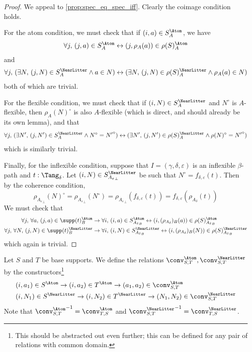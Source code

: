 \begin{proof}
  We appeal to \cref{prop:spec_eq_spec_iff}.
  Clearly the coimage condition holds.

  For the atom condition, we must check that if \( (i, a) \in S_A^\Atom \), we have
  \[ \forall j,\, (j, a) \in S_A^\Atom \leftrightarrow (j, \rho_A(a)) \in \rho(S)_A^\Atom \]
  and
  \[ \forall j,\, (\exists N,\, (j, N) \in S_A^\NearLitter \wedge a \in N) \leftrightarrow (\exists N,\, (j, N) \in \rho(S)_A^\NearLitter \wedge \rho_A(a) \in N) \]
  both of which are trivial.

  For the flexible condition, we must check that if \( (i, N) \in S_A^\NearLitter \) and \( N^\circ \) is \( A \)-flexible, then \( \rho_A(N)^\circ \) is also \( A \)-flexible (which is direct, and should already be its own lemma), and that
  \[ \forall j,\, (\exists N',\, (j, N') \in S_A^\NearLitter \wedge N^\circ = {N'}^\circ) \leftrightarrow (\exists N',\, (j, N') \in \rho(S)_A^\NearLitter \wedge \rho(N)^\circ = {N'}^\circ) \]
  which is similarly trivial.

  Finally, for the inflexible condition, suppose that \( I = (\gamma,\delta,\varepsilon) \) is an inflexible \( \beta \)-path and \( t : \Tang_\delta \).
  Let \( (i, N) \in S_{{A_\varepsilon}_\bot}^\NearLitter \) be such that \( N^\circ = f_{\delta,\varepsilon}(t) \).
  Then by the coherence condition,
  \[ \rho_{{A_\varepsilon}_\bot}(N)^\circ = \rho_{{A_\varepsilon}_\bot}(N^\circ) = \rho_{{A_\varepsilon}_\bot}(f_{\delta,\varepsilon}(t)) = f_{\delta,\varepsilon}(\rho_{A_\delta}(t)) \]
  We must check that
  \begin{align*}
    \forall j,\, \forall a,\, (j, a) \in \supp(t)_B^\Atom &\to \forall i,\, (i, a) \in S_{{A_\delta}_B}^\Atom \leftrightarrow (i, (\rho_{A_\delta})_B(a)) \in \rho(S)_{{A_\delta}_B}^\Atom \\
    \forall j,\, \forall N,\, (j, N) \in \supp(t)_B^\NearLitter &\to \forall i,\, (i, N) \in S_{{A_\delta}_B}^\NearLitter \leftrightarrow (i, (\rho_{A_\delta})_B(N)) \in \rho(S)_{{A_\delta}_B}^\NearLitter
  \end{align*}
  which again is trivial.
\end{proof}
\begin{definition}
  \label{def:conv_base}
  Let \( S \) and \( T \) be base supports.
  We define the relations \( \conv_{S,T}^\Atom, \conv_{S,T}^\NearLitter \) by the constructors\footnote{This should be abstracted out even further; this can be defined for any pair of relations with common domain.}
  \begin{align*}
    &(i, a_1) \in S^\Atom \to (i, a_2) \in T^\Atom \to (a_1, a_2) \in \conv_{S,T}^\Atom \\
    &(i, N_1) \in S^\NearLitter \to (i, N_2) \in T^\NearLitter \to (N_1, N_2) \in \conv_{S,T}^\NearLitter
  \end{align*}
  Note that \( {\conv_{S,T}^\Atom}^{-1} = \conv_{T,S}^\Atom \) and \( {\conv_{S,T}^\NearLitter}^{-1} = \conv_{T,S}^\NearLitter \).
\end{definition}
